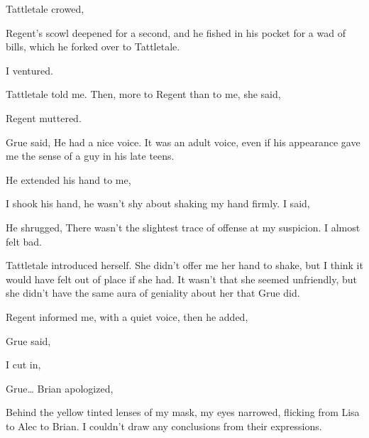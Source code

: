  Tattletale crowed, 

Regent's scowl deepened for a second, and he fished in his pocket for a wad of bills, which he forked over to Tattletale.

 I ventured.

 Tattletale told me. Then, more to Regent than to me, she said, 

 Regent muttered.

 Grue said,  He had a nice voice. It was an adult voice, even if his appearance gave me the sense of a guy in his late teens.

He extended his hand to me, 

I shook his hand, he wasn't shy about shaking my hand firmly. I said, 

He shrugged,  There wasn't the slightest trace of offense at my suspicion. I almost felt bad.

 Tattletale introduced herself. She didn't offer me her hand to shake, but I think it would have felt out of place if she had. It wasn't that she seemed unfriendly, but she didn't have the same aura of geniality about her that Grue did.

 Regent informed me, with a quiet voice, then he added, 

 Grue said, 

 I cut in, 

 Grue\ldots{} Brian apologized, 

Behind the yellow tinted lenses of my mask, my eyes narrowed, flicking from Lisa to Alec to Brian. I couldn't draw any conclusions from their expressions.

